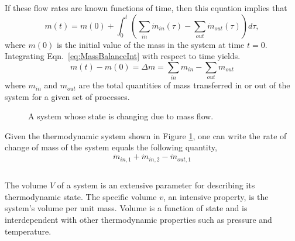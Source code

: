If these flow rates are known functions of time, then this equation implies that
\begin{equation}\label{eq:MassBalanceInt}
m(t) = m(0) + \int_0^t \left( \sum_{in}\dot{m}_{in}(\tau) - \sum_{out}\dot{m}_{out}(\tau)\right) d\tau,
\end{equation}
where $m(0)$ is the initial value of the mass in the system at time $t=0$. Integrating Eqn.~\eqref{eq:MassBalanceInt} with respect to time yields.
\begin{equation}\label{eq:MassBalanceInt2}
m(t) - m(0) = \Delta m =  \sum_{in}m_{in}- \sum_{out}m_{out}
\end{equation}
where $m_{in}$ and $m_{out}$ are the total quantities of mass transferred in or out of the system for a given set of processes. 
\begin{figure}[h]
\begin{center}
\end{center}
\caption{A system whose state is changing due to mass flow.}\label{fig:SysSchematic}
\end{figure}

Given the thermodynamic system shown in Figure \ref{fig:SysSchematic}, one can write the rate of change of mass of the system equals the following quantity,
\begin{equation}
\dot{m}_{in,1} +\dot{m}_{in,2} - \dot{m}_{out,1}
\end{equation}
\subsection{}
The volume $V$ of a system is an extensive parameter for describing its thermodynamic state. The specific volume $v$, an intensive property, is the system's volume per unit mass. Volume is a function of state and is interdependent with other thermodynamic properties such as pressure and temperature. 
